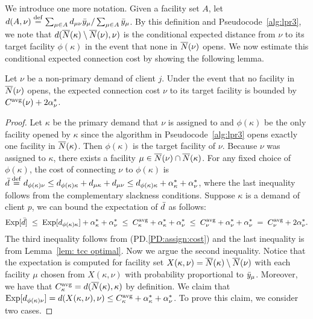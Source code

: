 We introduce one more notation. Given a facility set $A$,
let $d(A,\nu) \stackrel{\mathrm{def}}{=}\sum_{\mu\in A}
d_{\mu\nu}{\bar y}_{\mu}/\sum_{\mu\in A} {\bar y}_{\mu}$. By this
definition and Pseudocode~\ref{alg:lpr3}, we note that
$d({\overline{N}}(\kappa) \setminus {\overline{N}}(\nu), \nu)$ is the
conditional expected distance from $\nu$ to its target
facility $\phi(\kappa)$ in the event that none in
${\overline{N}}(\nu)$ opens. We now estimate this conditional
expected connection cost by showing the following lemma.
\begin{lemma}
  \label{lem:echu indirect}
  Let $\nu$ be a non-primary demand of client $j$. Under the
  event that no facility in ${\overline{N}}(\nu)$ opens, the
  expected connection cost $\nu$ to its target facility is
  bounded by $C^{{\mbox{\scriptsize\rm avg}}}(\nu)+2\alpha_{\nu}^\ast$.
\end{lemma}
\begin{proof}
  Let $\kappa$ be the primary demand that $\nu$ is assigned
  to and $\phi(\kappa)$ be the only facility opened by
  $\kappa$ since the algorithm in Pseudocode~\ref{alg:lpr3}
  opens exactly one facility in ${\overline{N}}(\kappa)$. Then
  $\phi(\kappa)$ is the target facility of $\nu$. Because
  $\nu$ was assigned to $\kappa$, there exists a facility
  $\mu\in {\overline{N}}(\nu)\cap {\overline{N}}(\kappa)$.  For any fixed
  choice of $\phi(\kappa)$, the cost of connecting $\nu$ to
  $\phi(\kappa)$ is ${\bar d} \stackrel{\mathrm{def}}{=}
  d_{\phi(\kappa)\nu} \le d_{\phi(\kappa)\kappa}+
  d_{\mu\kappa}+d_{\mu\nu} \le
  d_{\phi(\kappa)\kappa}+\alpha_{\kappa}^\ast +
  \alpha_{\nu}^\ast$, where the last inequality follows
  from the complementary slackness conditions. Suppose
  $\kappa$ is a demand of client $p$, we can bound the
  expectation of ${\bar d}$ as follows:
%
\begin{equation}
	\label{eqn: 1.76 connection cost}
  \mbox{\rm Exp}[{\bar d}] \;\leq\; \mbox{\rm Exp}[d_{\phi(\kappa) \kappa}]  + \alpha_{\kappa}^\ast + \alpha_{\nu}^\ast
  \;\leq\; C^{{\mbox{\scriptsize\rm avg}}}_{\kappa} + \alpha_{\kappa}^\ast + \alpha_{\nu}^\ast
  \;\leq\; C^{{\mbox{\scriptsize\rm avg}}}_{\nu} + \alpha_{\nu}^\ast + \alpha_{\nu}^\ast\;=\; C^{{\mbox{\scriptsize\rm avg}}}_{\nu} + 2\alpha_{\nu}^\ast.
\end{equation}
%
The third inequality follows from (PD.\ref{PD:assign:cost})
and the last inequality is from Lemma~\ref{lem: tcc
  optimal}. Now we argue the second inequality. Notice that
the expectation is computed for facility set
$X(\kappa,\nu)={\overline{N}}(\kappa) \setminus {\overline{N}}(\nu)$ with
each facility $\mu$ chosen from $X(\kappa,\nu)$ with
probability proportional to ${\bar y}_{\mu}$. Moreover, we have
that $C^{{\mbox{\scriptsize\rm avg}}}_{\kappa}=d({\overline{N}}(\kappa),\kappa)$ by
definition. We claim that $\mbox{\rm Exp}[d_{\phi(\kappa) \nu}] =
d(X(\kappa,\nu),\nu) \leq C^{{\mbox{\scriptsize\rm avg}}}_{\kappa} +
\alpha_{\kappa}^\ast + \alpha_{\nu}^\ast$. To prove this
claim, we consider two cases.


\end{proof}
